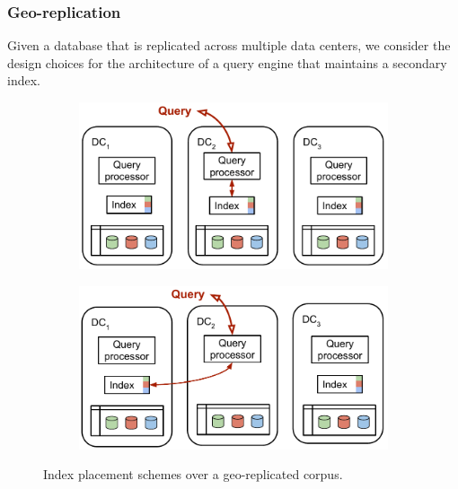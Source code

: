 \subsubsection{Geo-replication}
Given a database that is replicated across multiple data centers, we consider the design choices for the architecture
of a query engine that maintains a secondary index.

\begin{figure}[H]
  \centering
  \begin{subfigure}[b]{0.48\textwidth}
    \centering
    \includegraphics[width=\textwidth]{./figures/design_space/index_full_replication.pdf}
    \caption{}
    \label{fig:index_full_replication}
  \end{subfigure}
  \hfill
  \begin{subfigure}[b]{0.48\textwidth}
    \centering
    \includegraphics[width=\textwidth]{./figures/design_space/index_partial_replication.pdf}
    \caption{}
    \label{fig:index_partial_replication}
  \end{subfigure}
  \caption{Index placement schemes over a geo-replicated corpus.}
  \label{fig:index_placement_geo_replication}
\end{figure}


